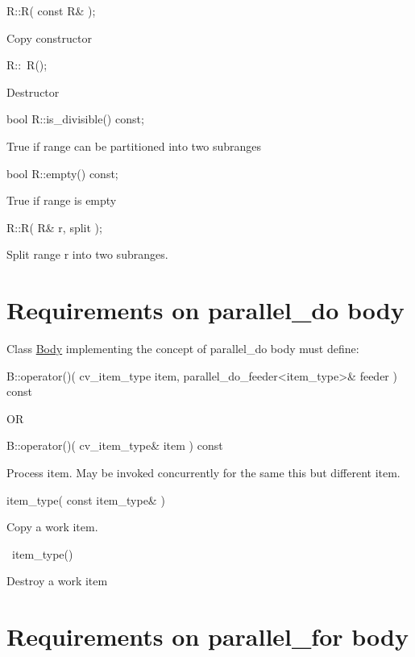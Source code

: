 \begin{DoxyItemize}
\item 
\begin{DoxyCode}
R::R( \textcolor{keyword}{const} R& ); 
\end{DoxyCode}
 Copy constructor
\item 
\begin{DoxyCode}
R::~R(); 
\end{DoxyCode}
 Destructor
\item 
\begin{DoxyCode}
\textcolor{keywordtype}{bool} R::is\_divisible() \textcolor{keyword}{const}; 
\end{DoxyCode}
 True if range can be partitioned into two subranges
\item 
\begin{DoxyCode}
\textcolor{keywordtype}{bool} R::empty() \textcolor{keyword}{const}; 
\end{DoxyCode}
 True if range is empty
\item 
\begin{DoxyCode}
R::R( R& r, split ); 
\end{DoxyCode}
 Split range {\ttfamily r} into two subranges. 
\end{DoxyItemize}\hypertarget{parallel_do_body_req}{}\section{Requirements on parallel\+\_\+do body}\label{parallel_do_body_req}
Class {\ttfamily \hyperlink{classBody}{Body}} implementing the concept of parallel\+\_\+do body must define\+:
\begin{DoxyItemize}
\item 
\begin{DoxyCode}
B::operator()( 
        cv\_item\_type item,
        parallel\_do\_feeder<item\_type>& feeder
) \textcolor{keyword}{const}

OR

B::operator()( cv\_item\_type& item ) \textcolor{keyword}{const}
\end{DoxyCode}
 Process item. May be invoked concurrently for the same {\ttfamily this} but different {\ttfamily item}.
\item 
\begin{DoxyCode}
item\_type( \textcolor{keyword}{const} item\_type& ) 
\end{DoxyCode}
 Copy a work item.
\item 
\begin{DoxyCode}
~item\_type() 
\end{DoxyCode}
 Destroy a work item 
\end{DoxyItemize}\hypertarget{parallel_for_body_req}{}\section{Requirements on parallel\+\_\+for body}\label{parallel_for_body_req}

